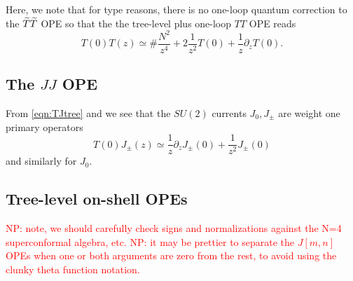 \documentclass[../main.tex]{subfiles}
\begin{document}
Here, we note that for type reasons, there is no one-loop quantum correction to the $\widetilde T \widetilde T$ OPE so that the the tree-level plus one-loop $TT$ OPE reads
\[
T(0) T(z) \simeq \# \frac{N^2}{z^4} + 2 \frac{1}{z^2} T(0) + \frac{1}{z} \partial_z T(0) .
\]


\subsection{The $JJ$ OPE } 

From \eqref{eqn:TJtree} and we see that the $SU(2)$ currents $J_0, J_\pm$ are weight one primary operators
\[
T(0) J_\pm (z) \simeq \frac1z \partial_z J_\pm (0) + \frac{1}{z^2} J_\pm (0) 
\]
and similarly for $J_0$. 

\subsection{Tree-level on-shell OPEs}
\textcolor{red}{NP: note, we should carefully check signs and normalizations against the N=4 superconformal algebra, etc.}
\textcolor{red}{NP: it may be prettier to separate the $J[m,n]$ OPEs when one or both arguments are zero from the rest, to avoid using the clunky theta function notation.}
\end{document}
